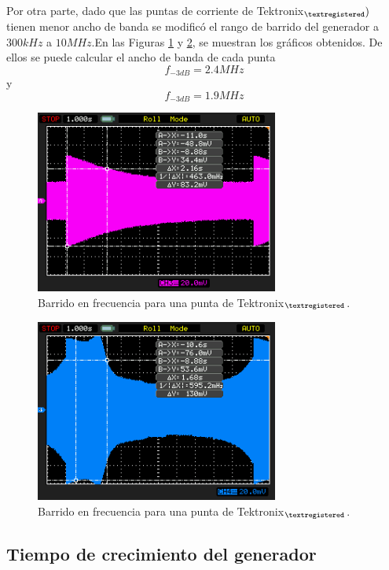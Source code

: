 \documentclass[a4paper,10pt]{article}
\begin{document}
		\indent Por otra parte, dado que las puntas de corriente de 
		Tektronix$_{\textregistered} )$ tienen menor ancho de banda se 
		modific\'o el rango de barrido del generador a $300kHz$ a $10MHz$.En 
		las Figuras \ref{img006} y \ref{img007}, se muestran los gr\'aficos 
		obtenidos. De ellos se puede calcular el ancho de banda de cada punta
		$$f_{-3dB}=2.4MHz$$ y $$f_{-3dB}=1.9MHz$$
		
		\begin{figure}[!htb]
			\centering
			\includegraphics[width=8cm]
			{Imagenes/Mediciones instrumentos/NewFile7.png}
			\caption{Barrido en frecuencia para una punta de 
			Tektronix$_{\textregistered}$.} \label{img006}
		\end{figure}		
	
		\begin{figure}[!htb]
			\centering
			\includegraphics[width=8cm]
			{Imagenes/Mediciones instrumentos/NewFile8.png}
			\caption{Barrido en frecuencia para una punta de 
			Tektronix$_{\textregistered}$.} \label{img007}
		\end{figure}
		
		\subsection{Tiempo de crecimiento del generador}
		
\end{document}
